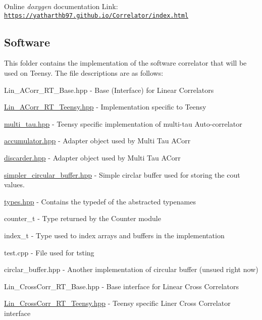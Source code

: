 Online {\itshape doxygen} documentation Link\+: \href{https://yatharthb97.github.io/Correlator/index.html}{\tt https\+://yatharthb97.\+github.\+io/\+Correlator/index.\+html}

\subsection*{Software}

This folder contains the implementation of the software correlator that will be used on Teensy. The file descriptions are as follows\+:


\begin{DoxyItemize}
\item {\ttfamily Lin\+\_\+\+A\+Corr\+\_\+\+R\+T\+\_\+\+Base.\+hpp} -\/ Base (Interface) for Linear Correlators
\item {\ttfamily \hyperlink{Lin__ACorr__RT__Teensy_8hpp}{Lin\+\_\+\+A\+Corr\+\_\+\+R\+T\+\_\+\+Teensy.\+hpp}} -\/ Implementation specific to Teensy
\item {\ttfamily \hyperlink{multi__tau_8hpp}{multi\+\_\+tau.\+hpp}} -\/ Teensy specific implementation of multi-\/tau Auto-\/correlator
\item {\ttfamily \hyperlink{accumulator_8hpp}{accumulator.\+hpp}} -\/ Adapter object used by Multi Tau A\+Corr
\item {\ttfamily \hyperlink{discarder_8hpp}{discarder.\+hpp}} -\/ Adapter object used by Multi Tau A\+Corr
\item {\ttfamily \hyperlink{simpler__circular__buffer_8hpp}{simpler\+\_\+circular\+\_\+buffer.\+hpp}} -\/ Simple circlar buffer used for storing the cout values.
\item {\ttfamily \hyperlink{types_8hpp}{types.\+hpp}} -\/ Contains the {\ttfamily typedef} of the abstracted typenames
\begin{DoxyItemize}
\item {\ttfamily counter\+\_\+t} -\/ Type returned by the Counter module
\item {\ttfamily index\+\_\+t} -\/ Type used to index arrays and buffers in the implementation
\end{DoxyItemize}
\item {\ttfamily test.\+cpp} -\/ File used for tsting
\item {\ttfamily circlar\+\_\+buffer.\+hpp} -\/ Another implementation of circular buffer (unsued right now)
\item {\ttfamily Lin\+\_\+\+Cross\+Corr\+\_\+\+R\+T\+\_\+\+Base.\+hpp} -\/ Base interface for Linear Cross Correlators
\item {\ttfamily \hyperlink{Lin__CrossCorr__RT__Teensy_8hpp}{Lin\+\_\+\+Cross\+Corr\+\_\+\+R\+T\+\_\+\+Teensy.\+hpp}} -\/ Teensy specific Liner Cross Correlator interface
\end{DoxyItemize}


